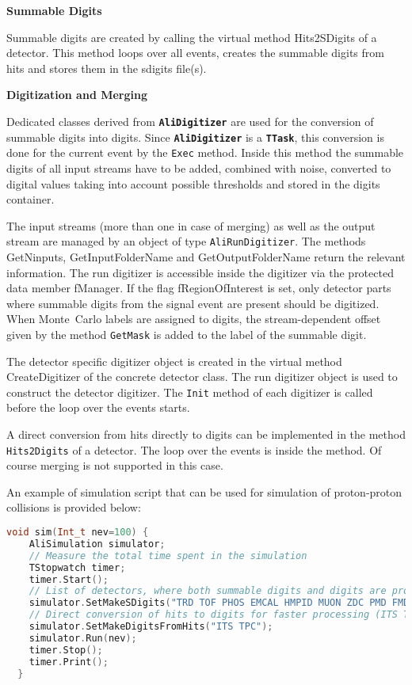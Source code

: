 \documentclass[12pt,a4paper,twoside]{article}
\makeatletter
\newcommand{\class}[1]{\texttt{\textbf{#1}}\xspace}
\newcommand{\method}[1]{\texttt{#1}\xspace}
\newcommand {\MC} {Monte~Carlo\@\xspace}
\makeatother
\begin{document}
\noindent
\textbf{Summable Digits}

Summable digits are created by calling the virtual method Hits2SDigits
of a detector. This method loops over all events, creates the summable
digits from hits and stores them in the sdigits file(s).

\noindent
\textbf{ Digitization and Merging}

Dedicated classes derived from \class{AliDigitizer} are used for the
conversion of summable digits into digits. Since \class{AliDigitizer}
is a \class{TTask}, this conversion is done for
the current event by the \method{Exec} method. Inside this method the summable
digits of all input streams have to be added, combined with noise,
converted to digital values taking into account possible thresholds
and stored in the digits container.

The input streams (more than one in case of merging) as well as the
output stream are managed by an object of type \method{AliRunDigitizer}. The
methods GetNinputs, GetInputFolderName and GetOutputFolderName return
the relevant information. The run digitizer is accessible inside the
digitizer via the protected data member fManager. If the flag
fRegionOfInterest is set, only detector parts where summable digits
from the signal event are present should be digitized. When \MC labels
are assigned to digits, the stream-dependent offset given by the
method \method{GetMask} is added to the label of the summable digit.

The detector specific digitizer object is created in the virtual
method CreateDigitizer of the concrete detector class. The run
digitizer object is used to construct the detector
digitizer. The \method{Init} method of each digitizer is called before the loop
over the events starts.


A direct conversion from hits directly to digits can be implemented in
the method \method{Hits2Digits} of a detector. The loop over the events is
inside the method. Of course merging is not supported in this case.

An example of simulation script that can be used for simulation of
proton-proton collisions is provided below:

\begin{lstlisting}[language=C++, title={Simulation run}]
  void sim(Int_t nev=100) {
    AliSimulation simulator;
    // Measure the total time spent in the simulation
    TStopwatch timer;
    timer.Start();
    // List of detectors, where both summable digits and digits are provided
    simulator.SetMakeSDigits("TRD TOF PHOS EMCAL HMPID MUON ZDC PMD FMD T0 VZERO");
    // Direct conversion of hits to digits for faster processing (ITS TPC)
    simulator.SetMakeDigitsFromHits("ITS TPC");
    simulator.Run(nev);
    timer.Stop();
    timer.Print();
  }
\end{lstlisting}
\end{document}
